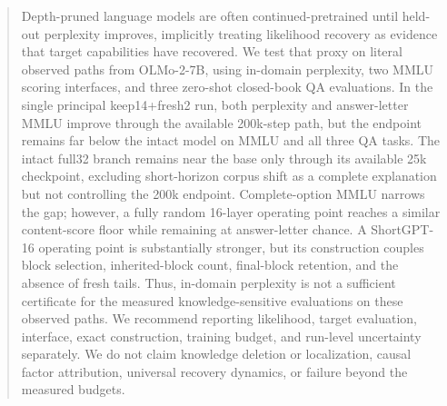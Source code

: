 \begin{abstract}
Depth-pruned language models are often continued-pretrained until held-out
perplexity improves, implicitly treating likelihood recovery as evidence that
target capabilities have recovered. We test that proxy on literal observed
paths from OLMo-2-7B, using in-domain perplexity, two MMLU scoring interfaces,
and three zero-shot closed-book QA evaluations. In the single principal
keep14+fresh2 run, both perplexity and answer-letter MMLU improve through the
available 200k-step path, but the endpoint remains far below the intact model on
MMLU and all three QA tasks. The intact full32 branch remains near the base only
through its available 25k checkpoint, excluding short-horizon corpus shift as a
complete explanation but not controlling the 200k endpoint. Complete-option
MMLU narrows the gap; however, a fully random 16-layer operating point reaches a
similar content-score floor while remaining at answer-letter chance. A
ShortGPT-16 operating point is substantially stronger, but its construction
couples block selection, inherited-block count, final-block retention, and the
absence of fresh tails. Thus, in-domain perplexity is not a sufficient
certificate for the measured knowledge-sensitive evaluations on these observed
paths. We recommend reporting likelihood, target evaluation, interface, exact
construction, training budget, and run-level uncertainty separately. We do not
claim knowledge deletion or localization, causal factor attribution, universal
recovery dynamics, or failure beyond the measured budgets.
\end{abstract}
